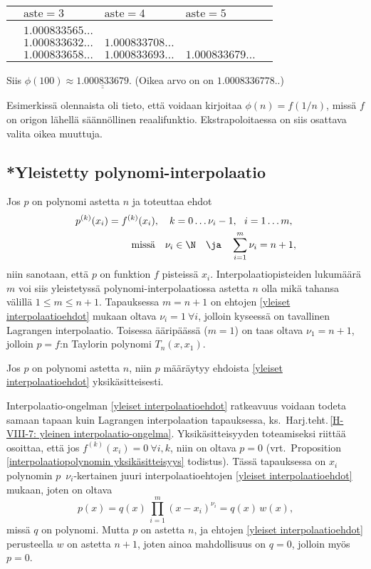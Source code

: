 \begin{center}
\begin{tabular}{lllll}
& $\text{aste}=3$ & $\text{aste}=4$ & $\text{aste}=5$ \\ \hline \\
& $1.000833565\ldots$ \\
& $1.000833632\ldots$ & $1.000833708\ldots$ \\
& $1.000833658\ldots$ & $1.000833693\ldots$ & $1.000833679\ldots$
\end{tabular}
\end{center}
Siis $\phi(100)\approx\underline{\underline{1.000833679}}$. (Oikea arvo on on $1.0008336778..$)
\loppu

Esimerkissä olennaista oli tieto, että voidaan kirjoitaa $\phi(n)=f(1/n)$, missä $f$ on origon 
lähellä säännöllinen reaalifunktio. Ekstrapoloitaessa on siis osattava valita oikea muuttuja.

\subsection*{*Yleistetty polynomi-interpolaatio}

Jos $p$ on polynomi astetta $n$ ja toteuttaa ehdot
\begin{equation} \label{yleiset interpolaatioehdot} 
\begin{aligned}
p^{(k)}(x_i) &= f^{(k)}(x_i),\quad k=0\ldots\nu_i-1,\ \ i=1\ldots m, \\ 
             &\qquad\ \text{missä}\quad \nu_i \in \N \quad \ja \quad \sum_{i=1}^m \nu_i=n+1,
\end{aligned} \end{equation}
niin sanotaan, että $p$ on funktion $f$  pisteissä
$x_i$. Interpolaatiopisteiden lukumäärä $m$ voi siis yleistetyssä polynomi-interpolaatiossa
astetta $n$ olla mikä tahansa välillä $1 \le m \le n+1$. Tapauksessa $m=n+1$ on ehtojen
\eqref{yleiset interpolaatioehdot} mukaan oltava $\nu_i=1\ \forall i$, jolloin kyseessä on 
tavallinen Lagrangen interpolaatio. Toisessa ääripäässä ($m=1$) on taas oltava $\nu_1=n+1$, 
jolloin $p =f$:n Taylorin polynomi $T_n(x,x_1)$.
\begin{Prop} Jos $p$ on polynomi astetta $n$, niin $p$ määräytyy ehdoista 
\eqref{yleiset interpolaatioehdot} yksikäsitteisesti. 
\end{Prop}
\tod Interpolaatio-ongelman \eqref{yleiset interpolaatioehdot} ratkeavuus voidaan todeta
samaan tapaan kuin Lagrangen interpolaation tapauksessa, ks.\
Harj.teht.\,\ref{H-VIII-7: yleinen interpolaatio-ongelma}. Yksikäsitteisyyden toteamiseksi
riittää osoittaa, että jos $f^{(k)}(x_i)=0\ \forall i,k$, niin on oltava $p=0$
(vrt.\ Proposition \ref{interpolaatiopolynomin yksikäsitteisyys} todistus). Tässä tapauksessa
on $x_i$  polynomin $p$ $\,\nu_i$-kertainen juuri interpolaatioehtojen
\eqref{yleiset interpolaatioehdot} mukaan, joten on oltava
\[ 
p(x) = q(x)\,\prod_{i=1}^m (x-x_i)^{\nu_i} = q(x)\,w(x), 
\]
missä $q$ on polynomi. Mutta $p$ on astetta $n$, ja ehtojen \eqref{yleiset interpolaatioehdot}
perusteella $w$ on astetta $n+1$, joten ainoa mahdollisuus on $q=0$, jolloin myös $p=0$.
\loppu

